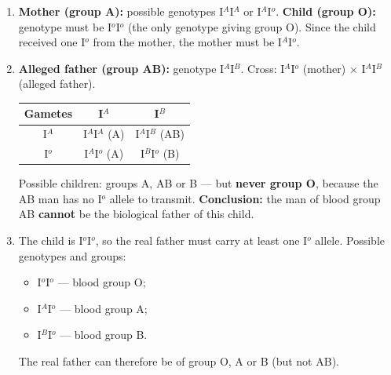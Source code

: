 \documentclass[11pt]{article}
\begin{document}
\begin{corrige}
\begin{enumerate}
\item \textbf{Mother (group A):} possible genotypes I$^A$I$^A$ or I$^A$I$^o$. \textbf{Child (group O):} genotype must be I$^o$I$^o$ (the only genotype giving group O). Since the child received one I$^o$ from the mother, the mother must be I$^A$I$^o$.
\item \textbf{Alleged father (group AB):} genotype I$^A$I$^B$. Cross: I$^A$I$^o$ (mother) $\times$ I$^A$I$^B$ (alleged father).

\begin{center}
\begin{tabular}{|c|c|c|}
\hline
\rowcolor{popblueL} Gametes & I$^A$ & I$^B$ \\
\hline
I$^A$ & I$^A$I$^A$ (A) & I$^A$I$^B$ (AB) \\
\hline
I$^o$ & I$^A$I$^o$ (A) & I$^B$I$^o$ (B) \\
\hline
\end{tabular}
\end{center}

Possible children: groups A, AB or B — but \textbf{never group O}, because the AB man has no I$^o$ allele to transmit. \textbf{Conclusion:} the man of blood group AB \textbf{cannot} be the biological father of this child.
\item The child is I$^o$I$^o$, so the real father must carry at least one I$^o$ allele. Possible genotypes and groups:
\begin{itemize}
\item I$^o$I$^o$ — blood group O;
\item I$^A$I$^o$ — blood group A;
\item I$^B$I$^o$ — blood group B.
\end{itemize}
The real father can therefore be of group O, A or B (but not AB).
\end{enumerate}
\end{corrige}
\end{document}
